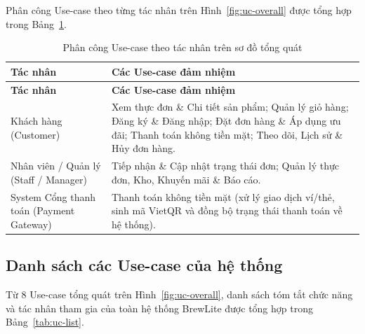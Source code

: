 \documentclass[12pt,a4paper]{report}
\begin{document}
Phân công Use-case theo từng tác nhân trên Hình~\ref{fig:uc-overall} được tổng hợp trong Bảng~\ref{tab:uc-actors}.

\begin{longtable}{>{\raggedright\arraybackslash}p{4.4cm}>{\raggedright\arraybackslash}p{10.8cm}}
\caption{Phân công Use-case theo tác nhân trên sơ đồ tổng quát}\label{tab:uc-actors}\\
\hline
\rowcolor{gray!20} \textbf{Tác nhân} & \textbf{Các Use-case đảm nhiệm} \\
\hline
\endfirsthead
\hline
\rowcolor{gray!20} \textbf{Tác nhân} & \textbf{Các Use-case đảm nhiệm} \\
\hline
\endhead
Khách hàng (Customer) & Xem thực đơn \& Chi tiết sản phẩm; Quản lý giỏ hàng; Đăng ký \& Đăng nhập; Đặt đơn hàng \& Áp dụng ưu đãi; Thanh toán không tiền mặt; Theo dõi, Lịch sử \& Hủy đơn hàng. \\
\hline
Nhân viên / Quản lý (Staff / Manager) & Tiếp nhận \& Cập nhật trạng thái đơn; Quản lý thực đơn, Kho, Khuyến mãi \& Báo cáo. \\
\hline
\guillemotleft{}System\guillemotright{} Cổng thanh toán (Payment Gateway) & Thanh toán không tiền mặt (xử lý giao dịch ví/thẻ, sinh mã VietQR và đồng bộ trạng thái thanh toán về hệ thống). \\
\hline
\end{longtable}

\subsection{Danh sách các Use-case của hệ thống}

Từ 8 Use-case tổng quát trên Hình~\ref{fig:uc-overall}, danh sách tóm tắt chức năng và tác nhân tham gia của toàn hệ thống BrewLite được tổng hợp trong Bảng~\ref{tab:uc-list}.
\end{document}
